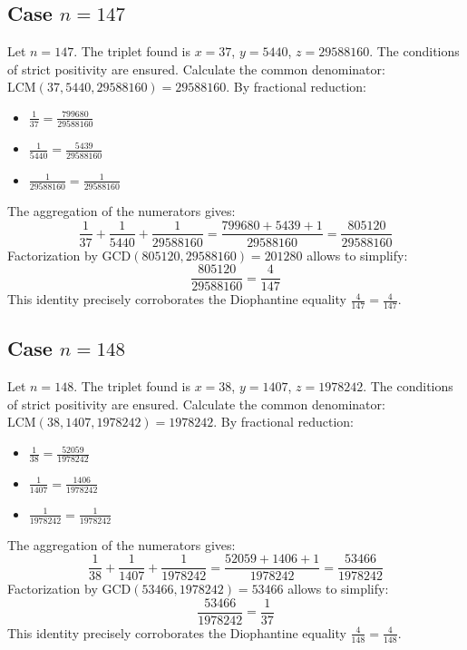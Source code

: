 \documentclass[11pt,a4paper]{article}
\begin{document}
\subsection{Case $n = 147$}
Let $n = 147$. The triplet found is $x = 37$, $y = 5440$, $z = 29588160$.
The conditions of strict positivity are ensured.
Calculate the common denominator: $\text{LCM}(37, 5440, 29588160) = 29588160$.
By fractional reduction:
\begin{itemize}
    \item $\frac{1}{37} = \frac{799680}{29588160}$
    \item $\frac{1}{5440} = \frac{5439}{29588160}$
    \item $\frac{1}{29588160} = \frac{1}{29588160}$
\end{itemize}
The aggregation of the numerators gives:
$$ \frac{1}{37} + \frac{1}{5440} + \frac{1}{29588160} = \frac{799680 + 5439 + 1}{29588160} = \frac{805120}{29588160} $$
Factorization by $\text{GCD}(805120, 29588160) = 201280$ allows to simplify:
$$ \frac{805120}{29588160} = \frac{4}{147} $$
This identity precisely corroborates the Diophantine equality $\frac{4}{147} = \frac{4}{147}$.

\subsection{Case $n = 148$}
Let $n = 148$. The triplet found is $x = 38$, $y = 1407$, $z = 1978242$.
The conditions of strict positivity are ensured.
Calculate the common denominator: $\text{LCM}(38, 1407, 1978242) = 1978242$.
By fractional reduction:
\begin{itemize}
    \item $\frac{1}{38} = \frac{52059}{1978242}$
    \item $\frac{1}{1407} = \frac{1406}{1978242}$
    \item $\frac{1}{1978242} = \frac{1}{1978242}$
\end{itemize}
The aggregation of the numerators gives:
$$ \frac{1}{38} + \frac{1}{1407} + \frac{1}{1978242} = \frac{52059 + 1406 + 1}{1978242} = \frac{53466}{1978242} $$
Factorization by $\text{GCD}(53466, 1978242) = 53466$ allows to simplify:
$$ \frac{53466}{1978242} = \frac{1}{37} $$
This identity precisely corroborates the Diophantine equality $\frac{4}{148} = \frac{4}{148}$.
\end{document}
